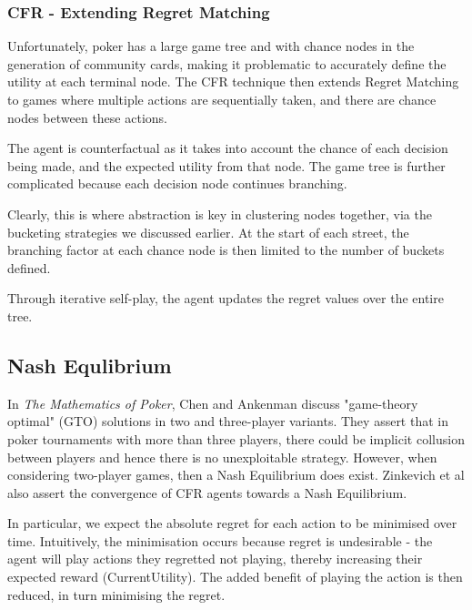 \documentclass{article}
\begin{document}
\subsubsection{CFR - Extending Regret Matching}

Unfortunately, poker has a large game tree and with chance nodes in the generation of community cards, making it problematic to accurately define the utility at each terminal node. The CFR technique then extends Regret Matching to games where multiple actions are sequentially taken, and there are chance nodes between these actions.

The agent is counterfactual as it takes into account the chance of each decision being made, and the expected utility from that node. The game tree is further complicated because each decision node continues branching. 

Clearly, this is where abstraction is key in clustering nodes together, via the bucketing strategies we discussed earlier. At the start of each street, the branching factor at each chance node is then limited to the number of buckets defined.

Through iterative self-play, the agent updates the regret values over the entire tree.

\subsection{Nash Equlibrium}

In \textit{The Mathematics of Poker}, Chen and Ankenman discuss "game-theory optimal" (GTO) solutions in two and three-player variants. They assert that in poker tournaments with more than three players, there could be implicit collusion between players and hence there is no unexploitable strategy. However, when considering two-player games, then a Nash Equilibrium does exist. Zinkevich et al also assert the convergence of CFR agents towards a Nash Equilibrium.

In particular, we expect the absolute regret for each action to be minimised over time. Intuitively, the minimisation occurs because regret is undesirable - the agent will play actions they regretted not playing, thereby increasing their expected reward (CurrentUtility). The added benefit of playing the action is then reduced, in turn minimising the regret.

\end{document}
